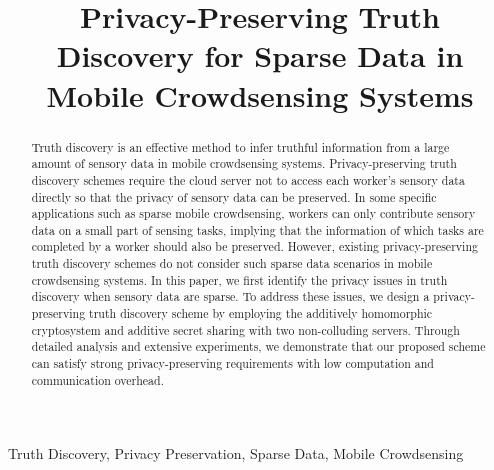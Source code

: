 \documentclass[conference]{IEEEtran}
\begin{document}
\title{Privacy-Preserving Truth Discovery for Sparse Data in Mobile Crowdsensing Systems\\
}


\author{
}

\maketitle

\begin{abstract}
Truth discovery is an effective method to infer truthful information from a large amount of sensory data in mobile crowdsensing systems.
Privacy-preserving truth discovery schemes require the cloud server not to access each worker's sensory data directly so that the privacy of sensory data can be preserved.
In some specific applications such as sparse mobile crowdsensing, workers can only contribute sensory data on a small part of sensing tasks, implying that the information of which tasks are completed by a worker should also be preserved.
However, existing privacy-preserving truth discovery schemes do not consider such sparse data scenarios in mobile crowdsensing systems.
In this paper, we first identify the privacy issues in truth discovery when sensory data are sparse.
To address these issues, we design a privacy-preserving truth discovery scheme by employing the additively homomorphic cryptosystem and additive secret sharing with two non-colluding servers.
Through detailed analysis and extensive experiments, we demonstrate that our proposed scheme can satisfy strong privacy-preserving requirements with low computation and communication overhead.
\end{abstract}
\begin{IEEEkeywords}
Truth Discovery, Privacy Preservation, Sparse Data, Mobile Crowdsensing
\end{IEEEkeywords}
\end{document}
